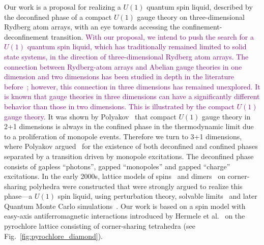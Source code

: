 \documentclass[twocolumn,superscriptaddress,amsmath,amssymb,aps,prx,nofootinbib]{revtex4-2}
\newcommand{\newtext}[1]{\textcolor{purple}{#1}}
\begin{document}
Our work is a proposal for realizing a $U(1)$ quantum spin liquid, described by the deconfined phase of a compact $U(1)$ gauge theory on three-dimensional Rydberg atom  arrays,  with an eye towards accessing the confinement-deconfinement transition. 
\newtext{With our proposal, we intend to push the search for a $U(1)$ quantum spin liquid, which has traditionally remained limited to solid state systems, in the direction of three-dimensional Rydberg atom arrays.
The connection between Rydberg-atom arrays and Abelian gauge theories in one dimension and two dimensions has been studied in depth in the literature before~\cite{cheng2024emergent, ohler2022self, surace2020lattice, cheng2023gauge}; however, this connection in three dimensions has remained unexplored. It is known that gauge theories in three dimensions can have a significantly different behavior than those in two dimensions. This is illustrated by the compact $U(1)$ gauge theory.}
It was shown by Polyakov~\cite{polyakovCompactGaugeFields1975,polyakov1977} that compact $U(1)$ gauge theory in 2+1 dimensions is always in the confined phase in the thermodynamic limit due to a proliferation of monopole events. Therefore we turn to 3+1 dimensions, where Polyakov argued~\cite{polyakov1977} for the existence of both deconfined and confined phases separated by a transition driven by monopole excitations. The deconfined phase consists of gapless ``photons'', gapped ``monopoles'' and gapped ``charge'' excitations. In the early 2000s, lattice models of spins~\cite{hermele2004} and dimers~\cite{huse2003} on corner-sharing polyhedra were constructed that were strongly argued to realize this phase---a $U(1)$ spin liquid, using perturbation theory, solvable limits~\cite{hermele2004} and later Quantum Monte Carlo simulations~\cite{banerjee2008,shannon2012}. Our work is based on a spin model with easy-axis antiferromagnetic interactions introduced by Hermele et al.~\cite{hermele2004} on the pyrochlore lattice consisting of corner-sharing tetrahedra (see Fig.~\ref{fig:pyrochlore_diamond}). 
\end{document}

